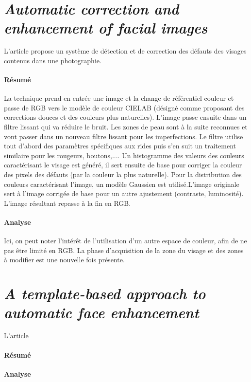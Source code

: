 \documentclass[11pt, french]{report-rd-info}
\begin{document}
\section{\emph{Automatic correction and enhancement of facial images}}
L'article \cite{Konoplev2012} propose un système de détection et de correction des défauts des visages contenus dans une photographie.

\paragraph{Résumé}
La technique prend en entrée une image et la change de référentiel couleur et passe de RGB vers le modèle de couleur CIELAB (désigné comme proposant des corrections douces et des couleurs plus naturelles). L'image passe ensuite dans un filtre lissant qui va réduire le bruit. Les zones de peau sont à la suite reconnues et vont passer dans un nouveau filtre lissant pour les imperfections. Le filtre utilise tout d'abord des paramètres spécifiques aux rides puis s'en suit un traitement similaire pour les rougeurs, boutons,.... Un histogramme des valeurs des couleurs caractérisant le visage est généré, il sert ensuite de base pour corriger la couleur des pixels des défauts (par la couleur la plus naturelle). Pour la distribution des couleurs caractérisant l'image, un modèle Gaussien est utilisé.L'image originale sert à l'image corrigée de base pour un autre ajustement (contraste, luminosité). L'image résultant repasse à la fin en RGB.

\paragraph{Analyse}
Ici, on peut noter l'intérêt de l'utilisation d'un autre espace de couleur, afin de ne pas être limité en RGB. La phase d'acquisition de la zone du visage et des zones à modifier est une nouvelle fois présente.


\section{\emph{A template-based approach to automatic face enhancement}}
L'article \cite{Melacci2009} 

\paragraph{Résumé}

\paragraph{Analyse}
\end{document}
